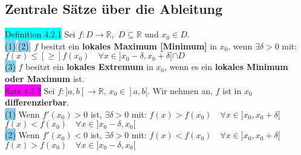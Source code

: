 \documentclass[landscape, 10pt]{article}
\newcommand{\R}{\mathbb{R}}
\begin{document}
\begin{multicols}{3}
       \subsection{Zentrale Sätze über die Ableitung}
              \colorbox{cyan}{Definition 4.2.1} 
                     Sei \textcolor{NavyBlue}{$f:D\longrightarrow\R$},\,
                     \textcolor{NavyBlue}{$D\subseteq\R$}
                     und \textcolor{NavyBlue}{$x_0\in D$}. \\
                     \colorbox{SkyBlue}{(1)}[\colorbox{SkyBlue}{(2)}] 
                            \textcolor{NavyBlue}{$f$} besitzt ein 
                            \textbf{lokales Maximum [Minimum]} in 
                            \textcolor{NavyBlue}{$x_0$}, wenn 
                            \textcolor{NavyBlue}{$\exists\delta>0$} mit: 
                            \textcolor{NavyBlue}{
                            $f(x)\leqslant[\geqslant] f(x_0)\quad
                            \forall x\in]x_0-\delta,x_0+\delta[\cap D$}\\
                     \colorbox{SkyBlue}{(3)} 
                            $f$ besitzt ein \textbf{lokales Extremum} 
                            in \textcolor{NavyBlue}{$x_0$}, wenn es ein 
                            \textbf{lokales Minimum oder Maximum} ist. \\
              \colorbox{magenta}{Satz 4.2.2} 
                     Sei \textcolor{NavyBlue}{
                     $f:]a,b[\longrightarrow\R,\,x_0\in]a,b[$}. 
                     Wir nehmen an, \textcolor{NavyBlue}{$f$} ist in 
                     \textcolor{NavyBlue}{$x_0$} \textbf{differenzierbar}.\\
                     \colorbox{SkyBlue}{(1)} Wenn \textcolor{NavyBlue}{$f'(x_0)>0$} 
                            ist, \textcolor{NavyBlue}{$\exists\delta>0$} mit: 
                            \textcolor{NavyBlue}{
                            $f(x)>f(x_0)\quad\forall x\in]x_0,x_0+\delta[$}
                            \textcolor{NavyBlue}{
                            $f(x)<f(x_0)\quad\forall x\in]x_0-\delta,x_0[$}\\
                     \colorbox{SkyBlue}{(2)} Wenn 
                            \textcolor{NavyBlue}{$f'(x_0)<0$} ist, 
                            \textcolor{NavyBlue}{$\exists\delta>0$} mit: 
                            \textcolor{NavyBlue}{
                            $f(x)<f(x_0)\quad\forall x\in]x_0,x_0+\delta[$}
                            \textcolor{NavyBlue}{
                            $f(x)>f(x_0)\quad\forall x\in]x_0-\delta,x_0[$}\\ 

\end{multicols}
\end{document}
